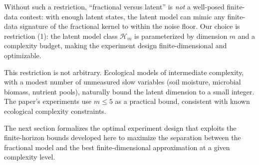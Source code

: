 Without such a restriction, ``fractional versus latent'' is \emph{not} a well-posed finite-data contest: with enough latent states, the latent model can mimic any finite-data signature of the fractional kernel to within the noise floor. Our choice is restriction (1): the latent model class \(\mathcal{H}_m\) is parameterized by dimension \(m\) and a complexity budget, making the experiment design finite-dimensional and optimizable.

This restriction is not arbitrary. Ecological models of intermediate complexity, with a modest number of unmeasured slow variables (soil moisture, microbial biomass, nutrient pools), naturally bound the latent dimension to a small integer. The paper's experiments use \(m \le 5\) as a practical bound, consistent with known ecological complexity constraints.

The next section formalizes the optimal experiment design that exploits the finite-horizon bounds developed here to maximize the separation between the fractional model and the best finite-dimensional approximation at a given complexity level.